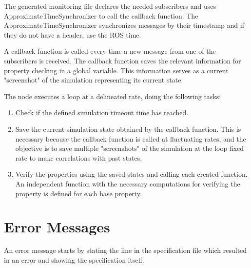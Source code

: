 
The generated monitoring file declares the needed subscribers and uses ApproximateTimeSynchronizer to call the callback function. The ApproximateTimeSynchronizer synchronizes messages by their timestamp and if they do not have a header, use the ROS time.

A callback function is called every time a new message from one of the subscribers is received. The callback function saves the relevant information for property checking in a global variable. This information serves as a current "screenshot" of the simulation representing its current state.

The node executes a loop at a delineated rate, doing the following tasks:

\begin{enumerate}
    \item Check if the defined simulation timeout time has reached.
    \item Save the current simulation state obtained by the callback function. This is necessary because the callback function is called at fluctuating rates, and the objective is to save multiple "screenshots" of the simulation at the loop fixed rate to make correlations with past states.
    \item Verify the properties using the saved states and calling each created function. An independent function with the necessary computations for verifying the property is defined for each base property.
\end{enumerate}


\section{Error Messages}
\label{sec:errormessages}

An error message starts by stating the line in the specification file which resulted in an error and showing the specification itself.

